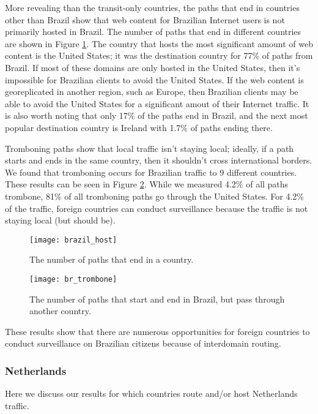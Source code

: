 More revealing than the transit-only countries, the paths that end in countries other than Brazil show that web content for Brazilian Internet users is not primarily hosted in Brazil.  The number of paths that end in different countries are shown in Figure \ref{fig:host_br}.  The country that hosts the most significant amount of web content is the United States; it was the destination country for 77\% of paths from Brazil.  If most of these domains are only hosted in the United States, then it's impossible for Brazilian clients to avoid the United States.  If the web content is georeplicated in another region, such as Europe, then Brazilian clients may be able to avoid the United States for a significant amout of their Internet traffic.  It is also worth noting that only 17\% of the paths end in Brazil, and the next most popular destination country is Ireland with 1.7\% of paths ending there.  

Tromboning paths show that local traffic isn't staying local; ideally, if a path starts and ends in the same country, then it shouldn't cross international borders.  We found that tromboning occurs for Brazilian traffic to 9 different countries.  These results can be seen in Figure \ref{fig:trombone_br}.  While we measured 4.2\% of all paths trombone, 81\% of all tromboning paths go through the United States.  For 4.2\% of the traffic, foreign countries can conduct surveillance because the traffic is not staying local (but should be). 

\begin{figure}[t!]
\centering
\texttt{[image: brazil\_host]}
\caption{The number of paths that end in a country.}
\label{fig:host_br}
\end{figure} 

\begin{figure}
\centering
\texttt{[image: br\_trombone]}
\caption{The number of paths that start and end in Brazil, but pass through another country.}
\label{fig:trombone_br}
\end{figure}

These results show that there are numerous opportunities for foreign countries to conduct surveillance on Brazilian citizens because of interdomain routing. 

\subsubsection{Netherlands}
Here we discuss our results for which countries route and/or host Netherlands traffic. 


